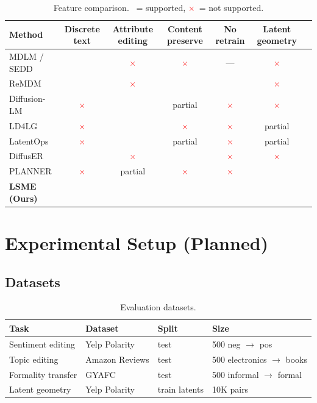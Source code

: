 \documentclass{article}
\newcommand{\gc}{\checkmark}
\newcommand{\rx}{\textcolor{red}{$\times$}}
\begin{document}
\begin{table}[h]
\centering
\caption{Feature comparison. \gc\ = supported, \rx\ = not supported.}
\begin{tabular}{lcccccc}
\toprule
\textbf{Method} & \textbf{Discrete text} & \textbf{Attribute editing} & \textbf{Content preserve} & \textbf{No retrain} & \textbf{Latent geometry} \\
\midrule
MDLM / SEDD & \gc & \rx & \rx & --- & \rx \\
ReMDM & \gc & \rx & \gc & \gc & \rx \\
Diffusion-LM & \rx & \gc & partial & \rx & \rx \\
LD4LG & \rx & \gc & \rx & \rx & partial \\
LatentOps & \rx & \gc & partial & \rx & partial \\
DiffusER & \gc & \rx & \gc & \rx & \rx \\
PLANNER & \rx & partial & \rx & \rx & \gc \\
\textbf{LSME (Ours)} & \gc & \gc & \gc & \gc & \gc \\
\bottomrule
\end{tabular}
\end{table}

\section{Experimental Setup (Planned)}

\subsection{Datasets}

\begin{table}[h]
\centering
\caption{Evaluation datasets.}
\begin{tabular}{llll}
\toprule
\textbf{Task} & \textbf{Dataset} & \textbf{Split} & \textbf{Size} \\
\midrule
Sentiment editing & Yelp Polarity & test & 500 neg $\to$ pos \\
Topic editing & Amazon Reviews & test & 500 electronics $\to$ books \\
Formality transfer & GYAFC & test & 500 informal $\to$ formal \\
Latent geometry & Yelp Polarity & train latents & 10K pairs \\
\bottomrule
\end{tabular}
\end{table}
\end{document}
